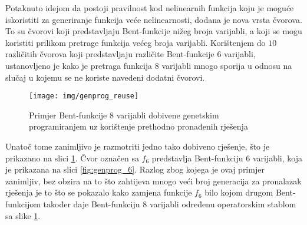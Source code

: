 Potaknuto idejom da postoji pravilnost kod nelinearnih funkcija koju je moguće iskoristiti za generiranje funkcija veće nelinearnosti, dodana je nova vrsta čvorova.
To su čvorovi koji predstavljaju Bent-funkcije nižeg broja varijabli, a koji se mogu koristiti prilikom pretrage funkcija većeg broja varijabli.
Korištenjem do $10$ različitih čvorova koji predstavljaju različite Bent-funkcije $6$ varijabli, ustanovljeno je kako je pretraga funkcija $8$ varijabli mnogo sporija u odnosu na slučaj u kojemu se ne koriste navedeni dodatni čvorovi.
\begin{figure}[ht!]
    \centering
    \texttt{[image: img/genprog\_reuse]}
    \captionsetup{justification=centering}
    \caption{Primjer Bent-funkcije $8$ varijabli dobivene genetskim programiranjem uz korištenje prethodno pronađenih rješenja}
    \label{fig:genprog_reuse}
\end{figure}
Unatoč tome zanimljivo je razmotriti jedno tako dobiveno rješenje, što je prikazano na slici \ref{fig:genprog_reuse}.
Čvor označen sa $f_6$ predstavlja Bent-funkciju $6$ varijabli, koja je prikazana na slici \ref{fig:genprog_6}.
Razlog zbog kojega je ovaj primjer zanimljiv, bez obzira na to što zahtijeva mnogo veći broj generacija za pronalazak rješenja je to što se pokazalo kako zamjena funkcije $f_6$ bilo kojom drugom Bent-funkcijom također daje Bent-funkciju $8$ varijabli određenu operatorskim stablom sa slike \ref{fig:genprog_reuse}.